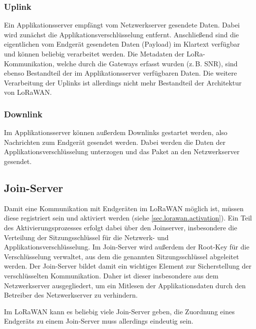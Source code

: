 \subsubsection{Uplink}
Ein Applikationsserver empfängt vom Netzwerkserver gesendete Daten.
Dabei wird zunächst die Applikationsverschlüsselung entfernt.
Anschließend sind die eigentlichen vom Endgerät gesendeten Daten (\gls{Payload}) im Klartext verfügbar und können beliebig verarbeitet werden.
Die Metadaten der LoRa-Kommunikation, welche durch die Gateways erfasst wurden (z.\,B. \gls{SNR}), sind ebenso Bestandteil der im Applikationsserver verfügbaren Daten.
Die weitere Verarbeitung der Uplinks ist allerdings nicht mehr Bestandteil der Architektur von LoRaWAN.

\subsubsection{Downlink}
Im Applikationsserver können außerdem Downlinks gestartet werden, also Nachrichten zum Endgerät gesendet werden.
Dabei werden die Daten der Applikationsverschlüsselung unterzogen und das Paket an den Netzwerkserver gesendet.


\subsection{Join-Server}
Damit eine Kommunikation mit Endgeräten im LoRaWAN möglich ist, müssen diese registriert sein und aktiviert werden (siehe \autoref{sec.lorawan.activation}).
Ein Teil des Aktivierungsprozesses erfolgt dabei über den \gls{Joinserver}, insbesondere die Verteilung der Sitzungsschlüssel für die Netzwerk- und Applikationsverschlüsselung.
Im Join-Server wird außerdem der Root-Key für die Verschlüsselung verwaltet, aus dem die genannten Sitzungsschlüssel abgeleitet werden.
Der Join-Server bildet damit ein wichtiges Element zur Sicherstellung der verschlüsselten Kommunikation.
Daher ist dieser insbesondere aus dem Netzwerkserver ausgegliedert, um ein Mitlesen der Applikationsdaten durch den Betreiber des Netzwerkserver zu verhindern.

Im LoRaWAN kann es beliebig viele Join-Server geben, die Zuordnung eines Endgeräts zu einem Join-Server muss allerdings eindeutig sein.



